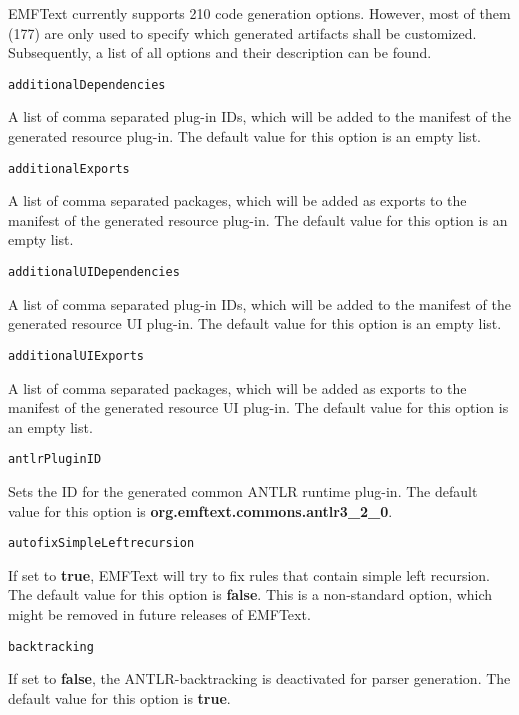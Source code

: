 EMFText currently supports 210 code generation options. However, most of them (177) are only used to specify which generated artifacts shall be customized. Subsequently, a list of all options and their description can be found.

\noindent\texttt{additionalDependencies}
\begin{myindentpar}{1cm}
A list of comma separated plug-in IDs, which will be added to the manifest of the generated resource plug-in. The default value for this option is an empty list.
\end{myindentpar}

\noindent\texttt{additionalExports}
\begin{myindentpar}{1cm}
A list of comma separated packages, which will be added as exports to the manifest of the generated resource plug-in. The default value for this option is an empty list.
\end{myindentpar}

\noindent\texttt{additionalUIDependencies}
\begin{myindentpar}{1cm}
A list of comma separated plug-in IDs, which will be added to the manifest of the generated resource UI plug-in. The default value for this option is an empty list.
\end{myindentpar}

\noindent\texttt{additionalUIExports}
\begin{myindentpar}{1cm}
A list of comma separated packages, which will be added as exports to the manifest of the generated resource UI plug-in. The default value for this option is an empty list.
\end{myindentpar}

\noindent\texttt{antlrPluginID}
\begin{myindentpar}{1cm}
Sets the ID for the generated common ANTLR runtime plug-in. The default value for this option is \textbf{org.emftext.commons.antlr3\_2\_0}.
\end{myindentpar}

\noindent\texttt{autofixSimpleLeftrecursion}
\begin{myindentpar}{1cm}
If set to \textbf{true}, EMFText will try to fix rules that contain simple left recursion. The default value for this option is \textbf{false}. This is a non-standard option, which might be removed in future releases of EMFText.
\end{myindentpar}

\noindent\texttt{backtracking}
\begin{myindentpar}{1cm}
If set to \textbf{false}, the ANTLR-backtracking is deactivated for parser generation. The default value for this option is \textbf{true}.
\end{myindentpar}

